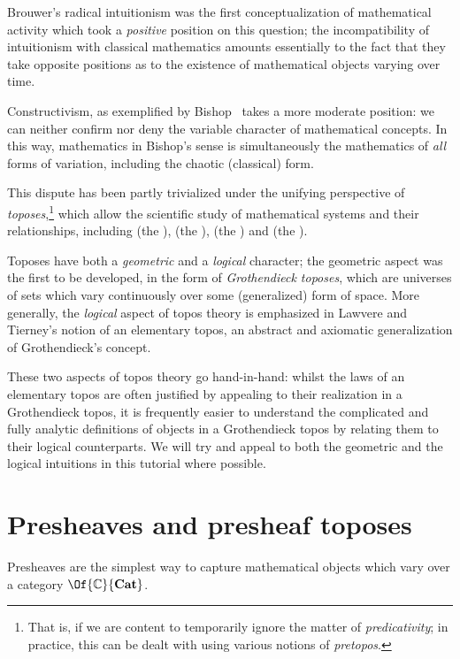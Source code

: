 \documentclass{article}
\newcommand\Cats{\mathbf{Cat}}
\begin{document}
Brouwer's radical intuitionism was the first conceptualization of
mathematical activity which took a \emph{positive} position on this
question; the incompatibility of intuitionism with classical
mathematics amounts essentially to the fact that they take opposite
positions as to the existence of mathematical objects varying over
time.

Constructivism, as exemplified by Bishop~\cite{bishop:1967} takes a
more moderate position: we can neither confirm nor deny the variable
character of mathematical concepts. In this way, mathematics in
Bishop's sense is simultaneously the mathematics of \emph{all} forms
of variation, including the chaotic (classical) form.

This dispute has been partly trivialized under the unifying
perspective of \emph{toposes},\footnote{That is, if we are content to
  temporarily ignore the matter of \emph{predicativity}; in practice,
  this can be dealt with using various notions of \emph{pretopos}.}
which allow the scientific study of mathematical systems and their
relationships, including  (the ),  (the ),  (the ) and 
(the ).

Toposes have both a \emph{geometric} and a \emph{logical} character;
the geometric aspect was the first to be developed, in the form of
\emph{Grothendieck toposes}, which are universes of sets which vary
continuously over some (generalized) form of space. More generally,
the \emph{logical} aspect of topos theory is emphasized in Lawvere and
Tierney's notion of an elementary topos, an abstract and axiomatic
generalization of Grothendieck's concept.

These two aspects of topos theory go hand-in-hand: whilst the laws of
an elementary topos are often justified by appealing to their
realization in a Grothendieck topos, it is frequently easier to
understand the complicated and fully analytic definitions of objects
in a Grothendieck topos by relating them to their logical
counterparts. We will try and appeal to both the geometric and the
logical intuitions in this tutorial where possible.

\section{Presheaves and presheaf toposes}
Presheaves are the simplest way to capture mathematical objects which
vary over a category $\Of{\mathbb{C}}{\Cats}$.
\end{document}
